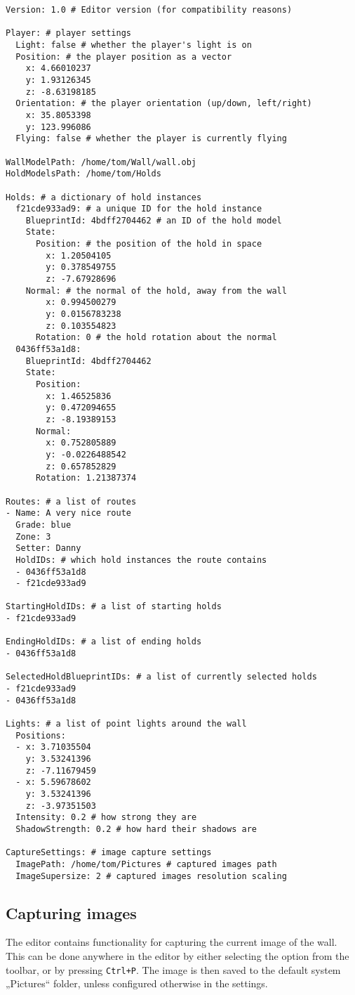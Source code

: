 \begin{verbatim}
Version: 1.0 # Editor version (for compatibility reasons)

Player: # player settings
  Light: false # whether the player's light is on
  Position: # the player position as a vector
    x: 4.66010237
    y: 1.93126345
    z: -8.63198185
  Orientation: # the player orientation (up/down, left/right)
    x: 35.8053398
    y: 123.996086
  Flying: false # whether the player is currently flying

WallModelPath: /home/tom/Wall/wall.obj
HoldModelsPath: /home/tom/Holds

Holds: # a dictionary of hold instances
  f21cde933ad9: # a unique ID for the hold instance
    BlueprintId: 4bdff2704462 # an ID of the hold model
    State:
      Position: # the position of the hold in space
        x: 1.20504105
        y: 0.378549755
        z: -7.67928696
    Normal: # the normal of the hold, away from the wall
        x: 0.994500279
        y: 0.0156783238
        z: 0.103554823
      Rotation: 0 # the hold rotation about the normal
  0436ff53a1d8:
    BlueprintId: 4bdff2704462
    State:
      Position:
        x: 1.46525836
        y: 0.472094655
        z: -8.19389153
      Normal:
        x: 0.752805889
        y: -0.0226488542
        z: 0.657852829
      Rotation: 1.21387374

Routes: # a list of routes
- Name: A very nice route
  Grade: blue
  Zone: 3
  Setter: Danny
  HoldIDs: # which hold instances the route contains
  - 0436ff53a1d8
  - f21cde933ad9

StartingHoldIDs: # a list of starting holds
- f21cde933ad9

EndingHoldIDs: # a list of ending holds
- 0436ff53a1d8

SelectedHoldBlueprintIDs: # a list of currently selected holds
- f21cde933ad9
- 0436ff53a1d8

Lights: # a list of point lights around the wall
  Positions:
  - x: 3.71035504
    y: 3.53241396
    z: -7.11679459
  - x: 5.59678602
    y: 3.53241396
    z: -3.97351503
  Intensity: 0.2 # how strong they are
  ShadowStrength: 0.2 # how hard their shadows are

CaptureSettings: # image capture settings
  ImagePath: /home/tom/Pictures # captured images path
  ImageSupersize: 2 # captured images resolution scaling
\end{verbatim}

\subsection{Capturing images}
The editor contains functionality for capturing the current image of the wall.
This can be done anywhere in the editor by either selecting the option from the toolbar, or by pressing \verb|Ctrl+P|.
The image is then saved to the default system „Pictures“ folder, unless configured otherwise in the settings.

